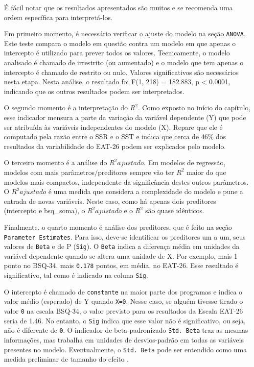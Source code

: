 \documentclass[
]{book}
\begin{document}
É fácil notar que os resultados apresentados são muitos e se recomenda uma ordem específica para interpretá-los.

Em primeiro momento, é necessário verificar o ajuste do modelo na seção \texttt{ANOVA}. Este teste compara o modelo em questão contra um modelo em que apenas o intercepto é utilizado para prever todos os valores. Tecnicamente, o modelo analisado é chamado de irrestrito (ou aumentado) e o modelo que tem apenas o intercepto é chamado de restrito ou nulo. Valores significativos são necessários nesta etapa. Nesta análise, o resultado foi F(1, 218) = 182.883, p \textless{} 0.0001, indicando que os outros resultados podem ser interpretados.

O segundo momento é a interpretação do \(R^2\). Como exposto no início do capítulo, esse indicador mensura a parte da variação da variável dependente (Y) que pode ser atribuída às variáveis independentes do modelo (X). Repare que ele é computado pela razão entre o SSR e o SST e indica que cerca de 46\% dos resultados da variabilidade do EAT-26 podem ser explicados pelo modelo.

O terceiro momento é a análise do \(R^2 ajustado\). Em modelos de regressão, modelos com mais parâmetros/preditores sempre vão ter \(R^2\) maior do que modelos mais compactos, independente da significância destes outros parâmetros. O \(R^2 ajustado\) é uma medida que considera a complexidade do modelo e pune a entrada de novas variáveis. Neste caso, como há apenas dois preditores (intercepto e bsq\_soma), o \(R^2 ajustado\) e o \(R^2\) são quase idênticos.

Finalmente, o quarto momento é análise dos preditores, que é feito na seção \texttt{Parameter\ Estimates}. Para isso, deve-se identificar os preditores um a um, seus valores de \texttt{Beta} e de P (\texttt{Sig}). O \texttt{Beta} indica a diferença média em unidades da variável dependente quando se altera uma unidade de X. Por exemplo, mais 1 ponto no BSQ-34, mais \texttt{0.178} pontos, em média, no EAT-26. Esse resultado é significativo, tal como é indicado na coluna \texttt{Sig}.

O intercepto é chamado de \texttt{constante} na maior parte dos programas e indica o valor médio (esperado) de Y quando \texttt{X=0}. Nesse caso, se alguém tivesse tirado o valor \texttt{0} na escala BSQ-34, o valor previsto para os resultados da Escala EAT-26 seria de 1.46. No entanto, o \texttt{Sig} indica que esse valor não é significativo, ou seja, não é diferente de \texttt{0}. O indicador de beta padronizado \texttt{Std.\ Beta} traz as mesmas informações, mas trabalha em unidades de desvios-padrão em todas as variáveis presentes no modelo. Eventualmente, o \texttt{Std.\ Beta} pode ser entendido como uma medida preliminar de tamanho do efeito \citep{fox2016}.
\end{document}
